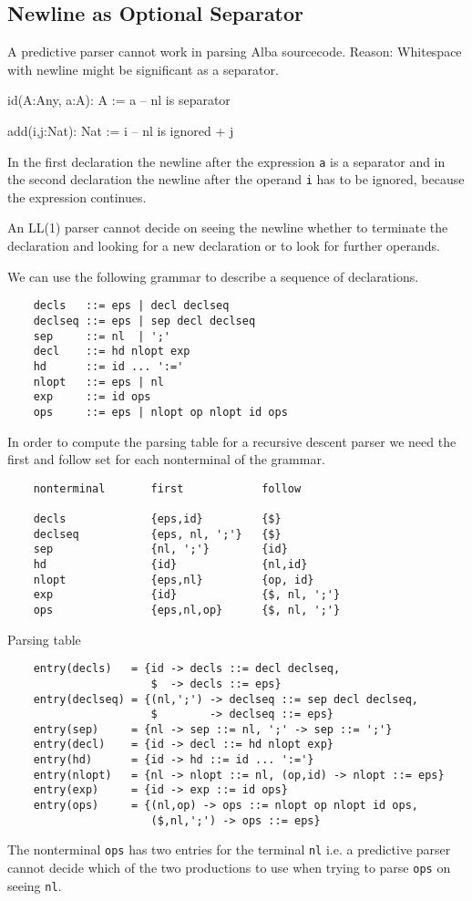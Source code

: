 \subsection{Newline as Optional Separator}

A predictive parser cannot work in parsing Alba sourcecode. Reason: Whitespace
with newline might be significant as a separator.

\begin{alba}
  id(A:Any, a:A): A :=
    a        -- nl is separator

  add(i,j:Nat): Nat :=
    i        -- nl is ignored
    + j
\end{alba}
%
In the first declaration the newline after the expression \verb!a! is a
separator and in the second declaration the newline after the operand \verb!i!
has to be ignored, because the expression continues.

An LL(1) parser cannot decide on seeing the newline whether to terminate the
declaration and looking for a new declaration or to look for further operands.

We can use the following grammar to describe a sequence of declarations.
{\scriptsize
\begin{verbatim}
    decls   ::= eps | decl declseq
    declseq ::= eps | sep decl declseq
    sep     ::= nl  | ';'
    decl    ::= hd nlopt exp
    hd      ::= id ... ':='
    nlopt   ::= eps | nl
    exp     ::= id ops
    ops     ::= eps | nlopt op nlopt id ops
\end{verbatim}
}
%
In order to compute the parsing table for a recursive descent parser we need
the first and follow set for each nonterminal of the grammar.
{\scriptsize
\begin{verbatim}
    nonterminal       first            follow

    decls             {eps,id}         {$}
    declseq           {eps, nl, ';'}   {$}
    sep               {nl, ';'}        {id}
    hd                {id}             {nl,id}
    nlopt             {eps,nl}         {op, id}
    exp               {id}             {$, nl, ';'}
    ops               {eps,nl,op}      {$, nl, ';'}
\end{verbatim}
}
%
Parsing table
{\scriptsize
\begin{verbatim}
    entry(decls)   = {id -> decls ::= decl declseq,
                      $  -> decls ::= eps}
    entry(declseq) = {(nl,';') -> declseq ::= sep decl declseq,
                      $        -> declseq ::= eps}
    entry(sep)     = {nl -> sep ::= nl, ';' -> sep ::= ';'}
    entry(decl)    = {id -> decl ::= hd nlopt exp}
    entry(hd)      = {id -> hd ::= id ... ':='}
    entry(nlopt)   = {nl -> nlopt ::= nl, (op,id) -> nlopt ::= eps}
    entry(exp)     = {id -> exp ::= id ops}
    entry(ops)     = {(nl,op) -> ops ::= nlopt op nlopt id ops,
                      ($,nl,';') -> ops ::= eps}
\end{verbatim}
}
%
The nonterminal \verb!ops! has two entries for the terminal \verb!nl! i.e. a
predictive parser cannot decide which of the two productions to use when
trying to parse \verb!ops! on seeing \verb!nl!.

